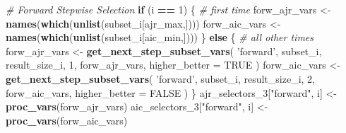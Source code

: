 \documentclass[
]{article}
\newenvironment{Shaded}{\begin{snugshade}}{\end{snugshade}}
\newcommand{\CommentTok}[1]{\textcolor[rgb]{0.56,0.35,0.01}{\textit{#1}}}
\newcommand{\ControlFlowTok}[1]{\textcolor[rgb]{0.13,0.29,0.53}{\textbf{#1}}}
\newcommand{\DataTypeTok}[1]{\textcolor[rgb]{0.13,0.29,0.53}{#1}}
\newcommand{\DecValTok}[1]{\textcolor[rgb]{0.00,0.00,0.81}{#1}}
\newcommand{\KeywordTok}[1]{\textcolor[rgb]{0.13,0.29,0.53}{\textbf{#1}}}
\newcommand{\NormalTok}[1]{#1}
\newcommand{\OperatorTok}[1]{\textcolor[rgb]{0.81,0.36,0.00}{\textbf{#1}}}
\newcommand{\OtherTok}[1]{\textcolor[rgb]{0.56,0.35,0.01}{#1}}
\newcommand{\StringTok}[1]{\textcolor[rgb]{0.31,0.60,0.02}{#1}}
\begin{document}
\begin{Shaded}
\begin{Highlighting}[]
  \CommentTok{# Forward Stepwise Selection}
  \ControlFlowTok{if}\NormalTok{ (i }\OperatorTok{==}\StringTok{ }\DecValTok{1}\NormalTok{) \{}
    \CommentTok{# first time}
\NormalTok{    forw_ajr_vars <-}\StringTok{ }\KeywordTok{names}\NormalTok{(}\KeywordTok{which}\NormalTok{(}\KeywordTok{unlist}\NormalTok{(subset_i[ajr_max,])))}
\NormalTok{    forw_aic_vars <-}\StringTok{ }\KeywordTok{names}\NormalTok{(}\KeywordTok{which}\NormalTok{(}\KeywordTok{unlist}\NormalTok{(subset_i[aic_min,])))}
\NormalTok{  \} }\ControlFlowTok{else}\NormalTok{ \{}
    \CommentTok{# all other times}
\NormalTok{    forw_ajr_vars <-}\StringTok{ }\KeywordTok{get_next_step_subset_vars}\NormalTok{(}
      \StringTok{'forward'}\NormalTok{, subset_i, result_size_i, }\DecValTok{1}\NormalTok{,}
\NormalTok{      forw_ajr_vars, }\DataTypeTok{higher_better =} \OtherTok{TRUE}
\NormalTok{      )}
\NormalTok{    forw_aic_vars <-}\StringTok{ }\KeywordTok{get_next_step_subset_vars}\NormalTok{(}
      \StringTok{'forward'}\NormalTok{, subset_i, result_size_i, }\DecValTok{2}\NormalTok{,}
\NormalTok{      forw_aic_vars, }\DataTypeTok{higher_better =} \OtherTok{FALSE}
\NormalTok{      )}
\NormalTok{  \}}
\NormalTok{  ajr_selectors_}\DecValTok{3}\NormalTok{[}\StringTok{"forward"}\NormalTok{, i] <-}\StringTok{ }\KeywordTok{proc_vars}\NormalTok{(forw_ajr_vars)}
\NormalTok{  aic_selectors_}\DecValTok{3}\NormalTok{[}\StringTok{"forward"}\NormalTok{, i] <-}\StringTok{ }\KeywordTok{proc_vars}\NormalTok{(forw_aic_vars)}



\end{Highlighting}
\end{Shaded}
\end{document}
